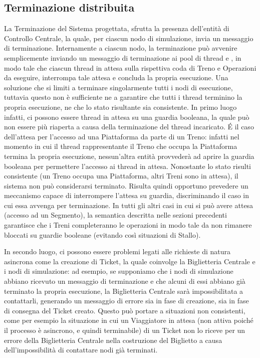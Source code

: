 \newpage
\subsection{Terminazione distribuita}\label{sec:distributed_termination}

La Terminazione del Sistema progettata, sfrutta la presenza dell'entità di Controllo Centrale, la quale, per ciascun nodo di simulazione, invia un messaggio di terminazione. Internamente a ciascun nodo, la terminazione può avvenire semplicemente inviando un messaggio di terminazione ai pool di thread  e , in modo tale che ciascun thread in attesa sulla rispettiva coda di Treno e Operazioni da eseguire, interrompa tale attesa e concluda la propria esecuzione. Una soluzione che si limiti a terminare singolarmente tutti i nodi di esecuzione, tuttavia questo non è sufficiente ne a garantire che tutti i thread terminino la propria esecuzione, ne che lo stato risultante sia consistente. In primo luogo infatti, ci possono essere thread in attesa su una guardia booleana, la quale può non essere più riaperta a causa della terminazione del thread incaricato. \'E il caso dell'attesa per l'accesso ad una Piattaforma da parte di un Treno: infatti nel momento in cui il thread rappresentante il Treno che occupa la Piattaforma termina la propria esecuzione, nessun'altra entità provvederà ad aprire la guardia booleana per permettere l'accesso ai thread in attesa. Nonostante lo stato risulti consistente (un Treno occupa una Piattaforma, altri Treni sono in attesa), il sistema non può considerarsi terminato. Risulta quindi opportuno prevedere un meccanismo capace di interrompere l'attesa su guardia, discriminando il caso in cui essa avvenga per terminazione. In tutti gli altri casi in cui si può avere attesa (accesso ad un Segmento), la semantica descritta nelle sezioni precedenti garantisce che i Treni completeranno le operazioni in modo tale da non rimanere bloccati su guardie booleane (evitando così situazioni di Stallo).

	In secondo luogo, ci possono essere problemi legati alle richieste di natura asincrona come la creazione di Ticket, la quale coinvolge la Biglietteria Centrale e i nodi di simulazione: ad esempio, se supponiamo che i nodi di simulazione abbiano ricevuto un messaggio di terminazione e che alcuni di essi abbiano già terminato la propria esecuzione, la Biglietteria Centrale sarà impossibilitata a contattarli, generando un messaggio di errore sia in fase di creazione, sia in fase di consegna del Ticket creato. Questo può portare a situazioni non consistenti, come per esempio la situazione in cui un Viaggiatore in attesa (non attiva poiché il processo è asincrono, e quindi terminabile) di un Ticket non lo riceve per un errore della Biglietteria Centrale nella costruzione del Biglietto a causa dell'impossibilità di contattare nodi già terminati.
	

